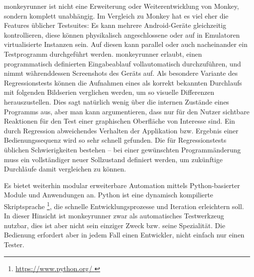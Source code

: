 monkeyrunner ist nicht eine Erweiterung oder Weiterentwicklung von Monkey,
sondern komplett unabhängig. Im Vergleich zu Monkey hat es viel eher die
Features üblicher Testsuites: Es kann mehrere Android-Geräte
gleichzeitig kontrollieren, diese können physikalisch angeschlossene oder
auf in Emulatoren virtualisierte Instanzen sein. Auf diesen kann parallel
oder auch nacheinander ein Testprogramm durchgeführt werden. monkeyrunner
erlaubt, einen programmatisch definierten Eingabeablauf vollautomatisch
durchzuführen, und nimmt währenddessen Screenshots des Geräts auf.
Als besondere Variante des Regressionstests können die Aufnahmen eines
als \glqq{}korrekt\grqq{} bekannten Durchlaufs mit folgenden Bildserien
verglichen werden, um so visuelle Differenzen herauszustellen. Dies sagt
natürlich wenig über die internen Zustände eines Programms aus, aber
man kann argumentieren, dass nur für den Nutzer sichtbare Reaktionen
für den Test einer graphischen Oberfläche von Interesse sind. Ein durch
Regression abweichendes Verhalten der Applikation bzw. Ergebnis einer
Bedienungssequenz wird so sehr schnell gefunden. Die für Regressionstests
üblichen Schwierigkeiten bestehen -- bei einer gewünschten Programmänderung
muss ein vollständiger neuer Sollzustand definiert werden, um zukünftige
Durchläufe damit vergleichen zu können.

Es bietet weiterhin modular erweiterbare Automation mittels Python-basierter
Module und Anwendungen an. Python ist eine dynamisch kompilierte Skriptsprache
\footnote{ \url{ https://www.python.org/ }}, die schnelle Entwicklungsprozesse
und Iteration erleichtern soll. In dieser Hinsicht ist monkeyrunner zwar
als automatisches Testwerkzeug nutzbar, dies ist aber nicht sein einziger
Zweck bzw. seine Spezialität. Die Bedienung erfordert aber in jedem Fall
einen Entwickler, nicht einfach nur einen Tester.


